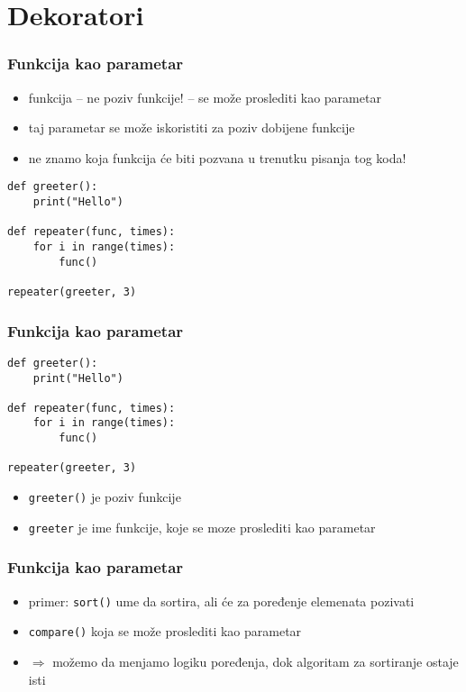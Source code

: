 \documentclass[utf8,compress,aspectratio=169]{beamer}
\begin{document}
\section[Dekoratori]{Dekoratori}

\begin{frame}[fragile]
  \frametitle{Funkcija kao parametar}
  \begin{itemize}
    \item funkcija -- ne poziv funkcije! -- se može proslediti kao parametar
    \item taj parametar se može iskoristiti za poziv dobijene funkcije
    \item ne znamo koja funkcija će biti pozvana u trenutku pisanja tog koda!
  \end{itemize}
\begin{verbatim}
def greeter():
    print("Hello")

def repeater(func, times):
    for i in range(times):
        func()

repeater(greeter, 3)
\end{verbatim}
\end{frame}

\begin{frame}[fragile]
  \frametitle{Funkcija kao parametar}
\begin{verbatim}
def greeter():
    print("Hello")

def repeater(func, times):
    for i in range(times):
        func()

repeater(greeter, 3)
\end{verbatim}
  \begin{itemize}
    \item \texttt{greeter()} je poziv funkcije
    \item \texttt{greeter} je ime funkcije, koje se moze proslediti kao parametar
  \end{itemize}
\end{frame}

\begin{frame}[fragile]
  \frametitle{Funkcija kao parametar}
  \begin{itemize}
    \item primer: \texttt{sort()} ume da sortira, ali će za poređenje elemenata pozivati
    \item \texttt{compare()} koja se može proslediti kao parametar
    \item $\Rightarrow$ možemo da menjamo logiku poređenja, dok algoritam za sortiranje ostaje isti
  \end{itemize}
\end{frame}
\end{document}
